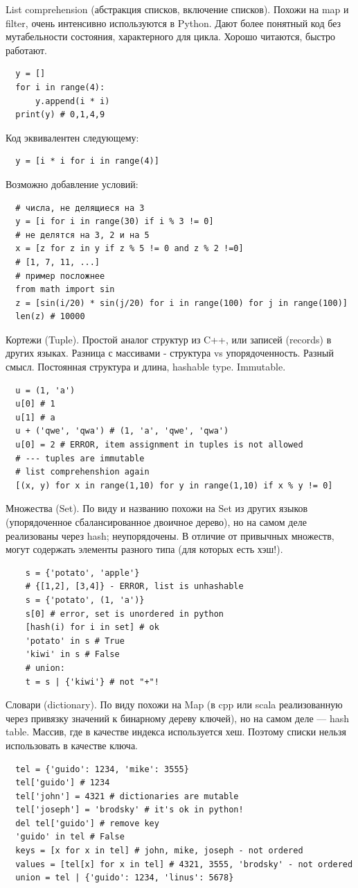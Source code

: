 \documentclass{book}
\begin{document}
List comprehension (абстракция списков, включение списков). Похожи на map и filter, очень интенсивно используются в Python. Дают более
понятный код без мутабельности состояния, характерного для цикла. Хорошо читаются, быстро работают.
\begin{verbatim}
  y = []
  for i in range(4):
      y.append(i * i)
  print(y) # 0,1,4,9
\end{verbatim}
Код эквивалентен следующему:
\begin{verbatim}
  y = [i * i for i in range(4)]
\end{verbatim}
Возможно добавление условий:
\begin{verbatim}
  # числа, не делящиеся на 3
  y = [i for i in range(30) if i % 3 != 0]
  # не делятся на 3, 2 и на 5
  x = [z for z in y if z % 5 != 0 and z % 2 !=0]
  # [1, 7, 11, ...]
  # пример посложнее
  from math import sin
  z = [sin(i/20) * sin(j/20) for i in range(100) for j in range(100)]
  len(z) # 10000
\end{verbatim}

Кортежи (Tuple). Простой аналог структур из C++, или записей (records) в других языках. Разница с массивами - структура vs упорядоченность.
Разный смысл. Постоянная структура и длина, hashable type. Immutable.
\begin{verbatim}
  u = (1, 'a')
  u[0] # 1
  u[1] # a
  u + ('qwe', 'qwa') # (1, 'a', 'qwe', 'qwa')
  u[0] = 2 # ERROR, item assignment in tuples is not allowed
  # --- tuples are immutable
  # list comprehenshion again
  [(x, y) for x in range(1,10) for y in range(1,10) if x % y != 0]
\end{verbatim}

Множества (Set). По виду и названию похожи на Set из других языков (упорядоченное сбалансированное двоичное дерево), но на самом деле
реализованы через hash; неупорядочены. В отличие от привычных множеств, могут содержать элементы разного типа (для которых есть хэш!).
\begin{verbatim}
    s = {'potato', 'apple'}
    # {[1,2], [3,4]} - ERROR, list is unhashable
    s = {'potato', (1, 'a')}
    s[0] # error, set is unordered in python
    [hash(i) for i in set] # ok
    'potato' in s # True
    'kiwi' in s # False
    # union:
    t = s | {'kiwi'} # not "+"!
\end{verbatim}

Словари (dictionary). По виду похожи на Map (в cpp или scala реализованную через привязку значений к бинарному дереву ключей), но на самом
деле --- hash table. Массив, где в качестве индекса используется хеш. Поэтому списки нельзя использовать в качестве ключа.
\begin{verbatim}
  tel = {'guido': 1234, 'mike': 3555}
  tel['guido'] # 1234
  tel['john'] = 4321 # dictionaries are mutable
  tel['joseph'] = 'brodsky' # it's ok in python!
  del tel['guido'] # remove key
  'guido' in tel # False
  keys = [x for x in tel] # john, mike, joseph - not ordered
  values = [tel[x] for x in tel] # 4321, 3555, 'brodsky' - not ordered
  union = tel | {'guido': 1234, 'linus': 5678}
\end{verbatim}
\end{document}
